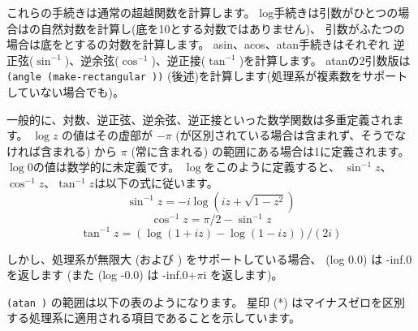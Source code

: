 \begin{entry}{%
}

これらの手続きは通常の超越関数を計算します。
{\cf log}手続きは引数がひとつの場合はの自然対数を計算し(底を10とする対数ではありません)、
引数がふたつの場合は底をとするの対数を計算します。
{\cf asin}、{\cf acos}、{\cf atan}手続きはそれぞれ
逆正弦($\sin^{-1}$)、逆余弦($\cos^{-1}$)、逆正接($\tan^{-1}$)を計算します。
{\cf atan}の2引数版は
{\tt (angle (make-rectangular  ))}
(後述)を計算します(処理系が複素数をサポートしていない場合でも)。

一般的に、対数、逆正弦、逆余弦、逆正接といった数学関数は多重定義されます。
$\log z$ の値はその虚部が $-\pi$ ({}が区別されている場合は含まれず、そうでなければ含まれる)
から $\pi$ (常に含まれる) の範囲にある場合は1に定義されます。
$\log 0$の値は数学的に未定義です。
$\log$をこのように定義すると、
$\sin^{-1} z$、$\cos^{-1} z$、$\tan^{-1} z$は以下の式に従います。
$$\sin^{-1} z = -i \log (i z + \sqrt{1 - z^2})$$
$$\cos^{-1} z = \pi / 2 - \sin^{-1} z$$
$$\tan^{-1} z = (\log (1 + i z) - \log (1 - i z)) / (2 i)$$

しかし、処理系が無限大 (および {}) をサポートしている場合、
{\cf (log 0.0)} は {\cf -inf.0} を返します
(また {\cf (log -0.0)} は {\cf -inf.0+$\pi$i} を返します)。

\texttt{({\cf atan}  )} の範囲は以下の表のようになります。
星印 (*) はマイナスゼロを区別する処理系に適用される項目であることを示しています。


\end{entry}
